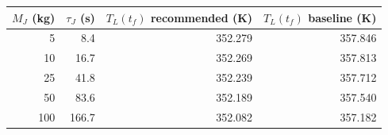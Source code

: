 \begin{tabular}{rrrr}
\toprule
$M_J$ (kg) & $\tau_J$ (s) & $T_L(t_f)$ recommended (K) & $T_L(t_f)$ baseline (K) \\
\midrule
5 & 8.4 & 352.279 & 357.846 \\
10 & 16.7 & 352.269 & 357.813 \\
25 & 41.8 & 352.239 & 357.712 \\
50 & 83.6 & 352.189 & 357.540 \\
100 & 166.7 & 352.082 & 357.182 \\
\bottomrule
\end{tabular}
